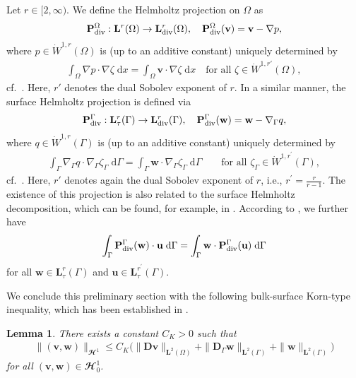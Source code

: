\documentclass[11pt,reqno]{amsart}
\newtheorem{lemma}[theorem]{Lemma}
\theoremstyle{remark}
\numberwithin{equation}{section}
\newcommand{\norm}[1]{\| #1 \|}
\newcommand{\intO}{\int_\Omega}
\newcommand{\intG}{\int_\Gamma}
\newcommand{\dx}{\;\mathrm{d}x}
\newcommand{\dG}{\;\mathrm d\Ga}
\newcommand{\Grad}{\nabla}
\newcommand{\Div}{\textnormal{div}}
\newcommand{\Gradg}{\nabla_\Ga}
\newcommand{\Om}{\Omega}
\newcommand{\Ga}{\Gamma}
\newcommand{\bv}{\mathbf v}
\newcommand{\bw}{\mathbf w}
\newcommand{\D}{\mathbf D}
\newcommand{\Dg}{\mathbf D_\Ga}
\begin{document}
Let $r\in[2,\infty)$. We define the Helmholtz projection on $\Om$ as
\begin{align*}
    \mathbf{P}_\Div^\Om:\mathbf{L}^r(\Om)\rightarrow\mathbf{L}^r_\Div(\Om),
    \quad
    \mathbf{P}_\Div^\Om(\bv) = \bv - \Grad p,
\end{align*}
where $p\in \dot{W}^{1,r}(\Om)$ is (up to an additive constant) uniquely determined by
\begin{align*}
	\intO \Grad p \cdot \Grad\zeta\dx = \intO \bv\cdot\Grad\zeta\dx
    \quad\text{for all $\zeta\in \dot{W}^{1,r'}(\Om)$},
\end{align*}
cf.~\cite[Theorem~1.4]{Simader1992}. Here, $r'$ denotes the dual Sobolev exponent of $r$. In a similar manner, the surface Helmholtz projection is defined via
\begin{align*}
    \mathbf{P}_\Div^\Ga: \mathbf{L}^r_{\tau}(\Gamma) \to \mathbf{L}^r_{\Div}(\Gamma),
    \quad
    \mathbf{P}_\Div^\Ga(\bw) = \bw - \Gradg q, %
\end{align*}
where $q \in \dot{W}^{1,r}(\Ga)$ is (up to an additive constant) uniquely determined by
\begin{align*}
    \intG \Gradg q\cdot\Gradg \zeta_\Ga \dG = \intG \bw\cdot\Gradg\zeta_\Ga\dG \qquad\text{for all~}\zeta_\Ga\in \dot{W}^{1,r^\prime}(\Ga),
\end{align*}
cf.~\cite[Lemma A.1]{Simonett2022}.
Here, $r'$ denotes again the dual Sobolev exponent of $r$, i.e., $r^\prime = \frac{r}{r-1}$.
The existence of this projection is also related to the surface Helmholtz decomposition, which can be found, for example, in \cite[Theorem~4.2]{Reusken2020}.
According to \cite[Sect.~2]{Simonett2022}, we further have
\begin{align*}
    \intG \mathbf{P}_\Div^\Ga(\bw) \cdot \mathbf u\dG = \intG \bw\cdot \mathbf{P}_\Div^\Ga(\mathbf u)\dG
\end{align*}
for all $\bw\in \mathbf{L}^r_\tau(\Ga)$ and $\mathbf u\in \mathbf{L}^{r^\prime}_\tau(\Ga)$.

We conclude this preliminary section with the following bulk-surface Korn-type inequality, which has been established in \cite[Lemma~5.1]{Knopf2025a}.

\begin{lemma}
    There exists a constant $C_K > 0$ such that
    \begin{align*}
        \norm{(\bv,\bw)}_{\mathbfcal{H}^1} \leq C_K\Big(\norm{\D\bv}_{\mathbf{L}^2(\Om)} + \norm{\Dg\bw}_{\mathbf{L}^2(\Ga)} + \norm{\bw}_{\mathbf{L}^2(\Ga)}\Big)
    \end{align*}
    for all $(\bv,\bw)\in\mathbfcal{H}^1_0$.
\end{lemma}
\end{document}
